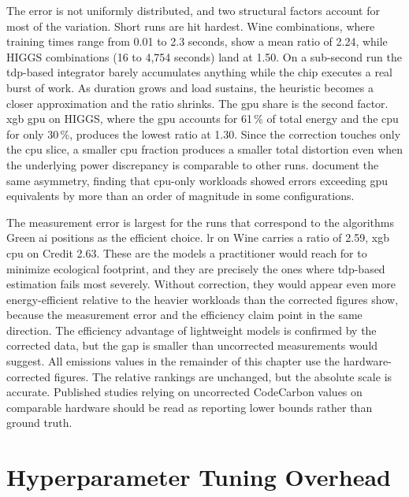The error is not uniformly distributed, and two structural factors account for most of the variation. Short runs are hit hardest. Wine combinations, where training times range from 0.01 to 2.3 seconds, show a mean ratio of 2.24, while HIGGS combinations (16 to 4{,}754 seconds) land at 1.50. On a sub-second run the \gls{tdp}-based integrator barely accumulates anything while the chip executes a real burst of work. As duration grows and load sustains, the heuristic becomes a closer approximation and the ratio shrinks. The \gls{gpu} share is the second factor. \gls{xgb} \gls{gpu} on HIGGS, where the \gls{gpu} accounts for 61\,\% of total energy and the \gls{cpu} for only 30\,\%, produces the lowest ratio at 1.30. Since the correction touches only the \gls{cpu} slice, a smaller \gls{cpu} fraction produces a smaller total distortion even when the underlying power discrepancy is comparable to other runs. \citeauthor{fischerGroundTruthingAIEnergy2025} \parencite{fischerGroundTruthingAIEnergy2025} document the same asymmetry, finding that \gls{cpu}-only workloads showed errors exceeding \gls{gpu} equivalents by more than an order of magnitude in some configurations.

The measurement error is largest for the runs that correspond to the algorithms Green \gls{ai} positions as the efficient choice. \gls{lr} on Wine carries a ratio of 2.59, \gls{xgb} \gls{cpu} on Credit 2.63. These are the models a practitioner would reach for to minimize ecological footprint, and they are precisely the ones where \gls{tdp}-based estimation fails most severely. Without correction, they would appear even more energy-efficient relative to the heavier workloads than the corrected figures show, because the measurement error and the efficiency claim point in the same direction. The efficiency advantage of lightweight models is confirmed by the corrected data, but the gap is smaller than uncorrected measurements would suggest. All emissions values in the remainder of this chapter use the hardware-corrected figures. The relative rankings are unchanged, but the absolute scale is accurate. Published studies relying on uncorrected CodeCarbon values on comparable hardware should be read as reporting lower bounds rather than ground truth.


\section{Hyperparameter Tuning Overhead}
\label{sec:results_tuning}

